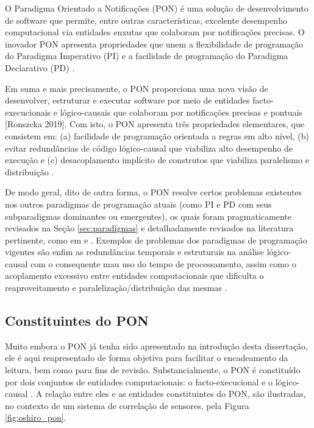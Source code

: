 O Paradigma Orientado a Notificações (PON) é uma solução de desenvolvimento de
software que permite, entre outras características, excelente desempenho
computacional via entidades enxutas que colaboram por notificações precisas. O
inovador PON apresenta propriedades que unem a flexibilidade de programação do
Paradigma Imperativo (PI) e a facilidade de programação do Paradigma Declarativo
(PD) \cite{doc_ronszcka_2019,oshiro_2021}. 

Em suma e mais precisamente, o PON proporciona uma nova visão de desenvolver,
estruturar e executar software por meio de entidades facto-execucionais e
lógico-causais que colaboram por notificações precisas e pontuais [Ronszcka
2019]. Com isto, o PON apresenta três propriedades elementares, que consistem
em: (a) facilidade de programação orientada a regras em alto nível, (b) evitar
redundâncias de código lógico-causal que viabiliza alto desempenho de execução e
(c) desacoplamento implícito de construtos que viabiliza paralelismo e
distribuição \cite{doc_ronszcka_2019,oshiro_2021}.

De modo geral, dito de outra forma, o PON resolve certos problemas existentes
nos outros paradigmas de programação atuais (como PI e PD com seus subparadigmas
dominantes ou emergentes), os quais foram pragmaticamente revisados na Seção
\ref{sec:paradigmas} e detalhadamente revisados na literatura pertinente, como
em  e
. Exemplos de problemas dos paradigmas de
programação vigentes são enfim as redundâncias temporais e estruturais na
análise lógico-causal com o consequente mau uso do tempo de processamento, assim
como o acoplamento excessivo entre entidades computacionais que dificulta o
reaproveitamento e paralelização/distribuição das mesmas
\cite{pat_simao_2008,msc_Banaszewski_2009,doc_linhares_2015,msc_pordeus_2017,doc_Kerschbaumer_2018,doc_ronszcka_2019}.

\subsection{Constituintes do PON}

Muito embora o PON já tenha sido apresentado na introdução desta dissertação,
ele é aqui reapresentado de forma objetiva para facilitar o encadeamento da
leitura, bem como para fins de revisão. Substancialmente, o PON é constituído
por dois conjuntos de entidades computacionais: o facto-execucional e o
lógico-causal \cite{doc_ronszcka_2019,oshiro_2021}. A relação entre eles e as
entidades constituintes do PON, são ilustradas, no contexto de um sistema de
correlação de sensores, pela Figura \ref{fig:oshiro_pon}.

